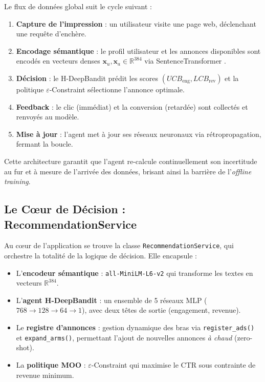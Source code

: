 Le flux de données global suit le cycle suivant :

\begin{enumerate}
    \item \textbf{Capture de l'impression} : un utilisateur visite une page web, déclenchant une requête d'enchère.
    \item \textbf{Encodage sémantique} : le profil utilisateur et les annonces disponibles sont encodés en vecteurs denses $\mathbf{x}_u, \mathbf{x}_a \in \mathbb{R}^{384}$ via SentenceTransformer \parencite{reimers2019sentence}.
    \item \textbf{Décision} : le H-DeepBandit \parencite{riquelme2018deep} prédit les scores $(UCB_{\text{eng}}, LCB_{\text{rev}})$ et la politique $\varepsilon$-Constraint \parencite{ehrgott2005multicriteria} sélectionne l'annonce optimale.
    \item \textbf{Feedback} : le clic (immédiat) et la conversion (retardée) sont collectés et renvoyés au modèle.
    \item \textbf{Mise à jour} : l'agent met à jour ses réseaux neuronaux via rétropropagation, fermant la boucle.
\end{enumerate}

Cette architecture garantit que l'agent re-calcule continuellement son incertitude au fur et à mesure de l'arrivée des données, brisant ainsi la barrière de l'\textit{offline training}.

\subsection{Le Cœur de Décision : RecommendationService}

Au cœur de l'application se trouve la classe \texttt{RecommendationService}, qui orchestre la totalité de la logique de décision. Elle encapsule :

\begin{itemize}
    \item L'\textbf{encodeur sémantique} : \texttt{all-MiniLM-L6-v2} \parencite{reimers2019sentence} qui transforme les textes en vecteurs $\mathbb{R}^{384}$.
    \item L'\textbf{agent H-DeepBandit} : un ensemble de 5 réseaux MLP ($768 \to 128 \to 64 \to 1$), avec deux têtes de sortie (engagement, revenue).
    \item Le \textbf{registre d'annonces} : gestion dynamique des bras via \texttt{register\_ads()} et \texttt{expand\_arms()}, permettant l'ajout de nouvelles annonces \textit{à chaud} (zero-shot).
    \item La \textbf{politique MOO} : $\varepsilon$-Constraint qui maximise le CTR sous contrainte de revenue minimum.
\end{itemize}

